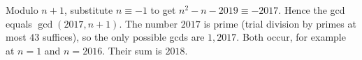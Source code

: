 Modulo $n+1$, substitute $n\equiv-1$ to get $n^2-n-2019\equiv-2017$. Hence the gcd equals $\gcd(2017,n+1)$. The number $2017$ is prime (trial division by primes at most $43$ suffices), so the only possible gcds are $1,2017$. Both occur, for example at $n=1$ and $n=2016$. Their sum is $\boxed{2018}$.

